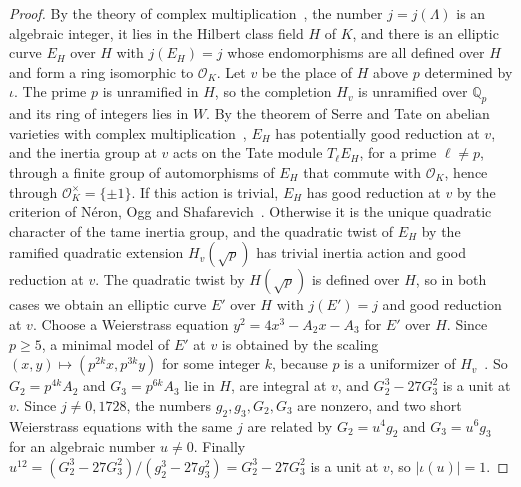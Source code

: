 \begin{proof}
By the theory of complex multiplication~\cite[Chapter~II, Theorems~4.1 and~2.2]{silvermanadv}, the number $j=j(\Lambda)$ is an algebraic integer, it lies in the Hilbert class field $H$ of $K$, and there is an elliptic curve $E_H$ over $H$ with $j(E_H)=j$ whose endomorphisms are all defined over $H$ and form a ring isomorphic to $\mathcal O_K$. Let $v$ be the place of $H$ above $p$ determined by $\iota$. The prime $p$ is unramified in $H$, so the completion $H_v$ is unramified over $\mathbb Q_p$ and its ring of integers lies in $W$. By the theorem of Serre and Tate on abelian varieties with complex multiplication~\cite[Theorem~6 and Corollary~1 to Theorem~7]{serretate}, $E_H$ has potentially good reduction at $v$, and the inertia group at $v$ acts on the Tate module $T_\ell E_H$, for a prime $\ell\ne p$, through a finite group of automorphisms of $E_H$ that commute with $\mathcal O_K$, hence through $\mathcal O_K^\times=\{\pm1\}$. If this action is trivial, $E_H$ has good reduction at $v$ by the criterion of N\'eron, Ogg and Shafarevich~\cite[Theorem~1]{serretate}. Otherwise it is the unique quadratic character of the tame inertia group, and the quadratic twist of $E_H$ by the ramified quadratic extension $H_v(\sqrt{p})$ has trivial inertia action and good reduction at $v$. The quadratic twist by $H(\sqrt p)$ is defined over $H$, so in both cases we obtain an elliptic curve $E'$ over $H$ with $j(E')=j$ and good reduction at $v$. Choose a Weierstrass equation $y^2=4x^3-A_2x-A_3$ for $E'$ over $H$. Since $p\ge5$, a minimal model of $E'$ at $v$ is obtained by the scaling $(x,y)\mapsto(p^{2k}x,p^{3k}y)$ for some integer $k$, because $p$ is a uniformizer of $H_v$~\cite[Chapter~VII, Section~1]{silvermanaec}. So $G_2=p^{4k}A_2$ and $G_3=p^{6k}A_3$ lie in $H$, are integral at $v$, and $G_2^3-27G_3^2$ is a unit at $v$. Since $j\ne0,1728$, the numbers $g_2,g_3,G_2,G_3$ are nonzero, and two short Weierstrass equations with the same $j$ are related by $G_2=u^4g_2$ and $G_3=u^6g_3$ for an algebraic number $u\ne0$. Finally $u^{12}=(G_2^3-27G_3^2)/(g_2^3-27g_3^2)=G_2^3-27G_3^2$ is a unit at $v$, so $\lvert\iota(u)\rvert=1$.
\end{proof}

